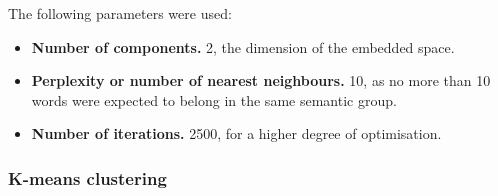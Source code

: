 \documentclass[14pt, a4paper]{extreport}
\begin{document}
The following parameters were used:

\begin{itemize}
  \item \textbf{Number of components.} 2, the dimension of the embedded space.
  \item \textbf{Perplexity or number of nearest neighbours.} 10, as no more than 10 words were expected to belong in the same semantic group.
  \item \textbf{Number of iterations.} 2500, for a higher degree of optimisation.
\end{itemize}

      \subsubsection{K-means clustering}
\end{document}
